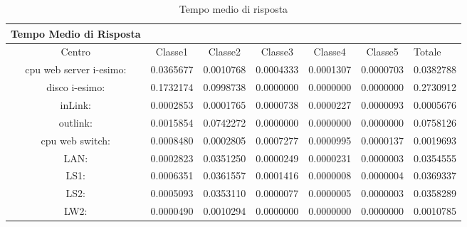 \begin{table}[htbp]
\begin{center}
\begin{tabular}{||c|c|c|c|c|c||}
\hline
Tempo Medio di Risposta\\
\hline
Centro &Classe1 &Classe2 &Classe3 &Classe4 &Classe5 &Totale\\
\hline
\hline
 cpu web server i-esimo: 	&0.0365677	&0.0010768	&0.0004333	&0.0001307	&0.0000703	&0.0382788\\
\hline
 disco i-esimo: 	&0.1732174	&0.0998738	&0.0000000	&0.0000000	&0.0000000	&0.2730912\\
\hline
 inLink: 	&0.0002853	&0.0001765	&0.0000738	&0.0000227	&0.0000093	&0.0005676\\
\hline
 outlink: 	&0.0015854	&0.0742272	&0.0000000	&0.0000000	&0.0000000	&0.0758126\\
\hline
 cpu web switch: 	&0.0008480	&0.0002805	&0.0007277	&0.0000995	&0.0000137	&0.0019693\\
\hline
 LAN: 	&0.0002823	&0.0351250	&0.0000249	&0.0000231	&0.0000003	&0.0354555\\
\hline
 LS1: 	&0.0006351	&0.0361557	&0.0001416	&0.0000008	&0.0000004	&0.0369337\\
\hline
 LS2: 	&0.0005093	&0.0353110	&0.0000077	&0.0000005	&0.0000003	&0.0358289\\
\hline
 LW2: 	&0.0000490	&0.0010294	&0.0000000	&0.0000000	&0.0000000	&0.0010785\\
\hline
\end{tabular}
\end{center}
\caption{Tempo medio di risposta}
\label{tempomediodirisposta}
\end{table}

